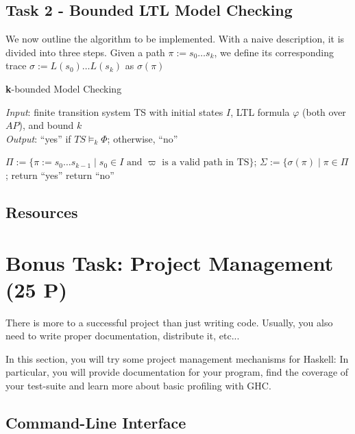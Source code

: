 \documentclass{article}
\begin{document}
\subsection*{Task 2 - Bounded LTL Model Checking}
We now outline the algorithm to be implemented. With a naive description, it is divided into three steps. Given a path $\pi := s_0 \dots s_k$, we define its corresponding trace $\sigma := L(s_0) \dots L(s_k)$ as $\sigma(\pi)$
\begin{algorithm}[H]
    \caption{\textbf{k}-bounded  Model Checking}
    \hspace*{\algorithmicindent} \emph{Input}: finite transition system TS with initial states $I$, LTL formula $\varphi$ (both over $AP$), and bound $k$ \\
    \hspace*{\algorithmicindent} \emph{Output}: ``yes'' if $TS \vDash_k \Phi$; otherwise, ``no''
    \begin{algorithmic}
    \State $\Pi := \{ \pi := s_0 \dots s_{k-1} \mid s_0 \in I \text{ and } \varpi \text{ is a valid path in TS} \}  $;
    \State $\Sigma := \{ \sigma(\pi) \mid  \pi \in \Pi$;
        \State return ``yes''
    \Else 
        \State return ``no''
    \EndIf
    \end{algorithmic}
\end{algorithm}

\subsection*{Resources}
\cite[Paragraph 5.1 (in particular 5.1.1 and 5.1.2)]{BaKa}

\section{Bonus Task: Project Management (25 P)}
\label{sec-bonus}

There is more to a successful project than just writing code. 
Usually, you also need to write proper documentation, distribute it, etc...

In this section, you will try some project management mechanisms for Haskell: 
In particular, you will provide documentation for your program, 
find the coverage of your test-suite and learn more about basic profiling with GHC.

\subsection{Command-Line Interface}
\end{document}
